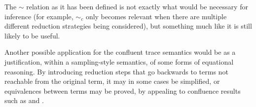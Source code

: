 The $\sim$ relation as it has been defined is not exactly what would be necessary for inference (for example, $\sim_c$ only becomes relevant when there are multiple different reduction strategies being considered), but something much like it is still likely to be useful.

\medskip
Another possible application for the confluent trace semantics would be as a justification, within a sampling-style semantics, of some forms of equational reasoning. By introducing reduction steps that go backwards to terms not reachable from the original term, it may in some cases be simplified, or equivalences between terms may be proved, by appealing to confluence results such as  and .
